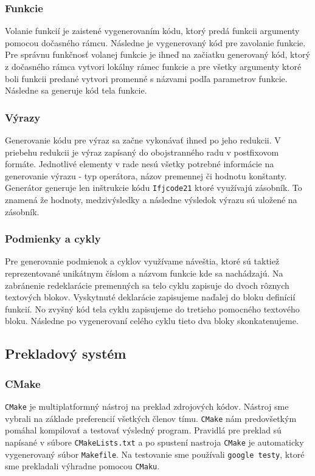 \documentclass[a4paper, 11pt]{article}
\begin{document}
    \subsubsection{Funkcie}
    Volanie funkcií je zaistené vygenerovaním kódu, ktorý predá funkcii argumenty pomocou dočasného rámcu. Následne
    je vygenerovaný kód pre zavolanie funkcie. Pre správnu funkčnosť volanej funkcie je ihneď na začiatku generovaný kód,
    ktorý z dočasného rámca vytvori lokálny rámec funkcie a pre všetky argumenty ktoré boli funkcii predané vytvori
    promenné s názvami podľa parametrov funkcie. Následne sa generuje kód tela funkcie.

    \subsubsection{Výrazy}
    Generovanie kódu pre výraz sa začne vykonávať ihned po jeho redukcii. V priebehu redukcii je výraz zapísaný do obojstranného radu
    v postfixovom formáte. Jednotlivé elementy v rade nesú všetky potrebné
    informácie na generovanie výrazu - typ operátora, názov premennej či hodnotu konštanty. Generátor generuje len inštrukcie
    kódu \texttt{Ifjcode21} ktoré využívajú zásobník. To znamená že hodnoty, medzivýsledky a následne výsledok výrazu sú
    uložené na zásobník.

    \subsubsection{Podmienky a cykly}
    Pre generovanie podmienok a cyklov využívame náveštia, ktoré sú taktiež reprezentované unikátnym číslom a
    názvom funkcie kde sa nachádzajú. Na zabránenie redeklarácie premenných sa telo cyklu zapisuje do dvoch rôznych textových
    blokov. Vyskytnuté deklarácie zapisujeme naďalej do bloku definícií funkcií. No zvyšný kód tela cyklu zapisujeme do
    tretieho pomocného textového bloku. Následne po vygenerovaní celého cyklu tieto dva bloky skonkatenujeme.

    \subsection{Prekladový systém}
    \subsubsection{CMake}
    \texttt{CMake} je multiplatformný nástroj na preklad zdrojových kódov. Nástroj sme vybrali na základe preferencií všetkých
    členov tímu. \texttt{CMake} nám predovšetkým pomáhal kompilovať a testovať výsledný program. Pravidlá pre preklad sú napísané v súbore
    \texttt{CMakeLists.txt} a po spustení nastroja \texttt{CMake} je automaticky vygenerovaný súbor \texttt{Makefile}.
    Na testovanie sme používali \texttt{google testy}, ktoré sme prekladali výhradne pomocou \texttt{CMaku}.
\end{document}
